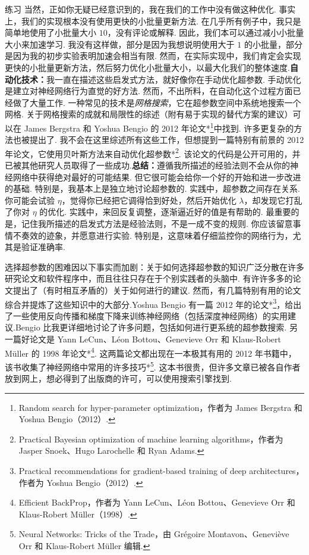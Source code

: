 \begin{exerciseBox}{练习}
当然，正如你无疑已经意识到的，我在我们的工作中没有做这种优化. 事实上，我们的实现根本没有使用更快的小批量更新方法. 在几乎所有例子中，我只是简单地使用了小批量大小 $10$，没有评论或解释. 因此，我们本可以通过减小小批量大小来加速学习. 我没有这样做，部分是因为我想说明使用大于 $1$ 的小批量，部分是因为我的初步实验表明加速会相当有限. 然而，在实际实现中，我们肯定会实现更快的小批量更新方法，然后努力优化小批量大小，以最大化我们的整体速度.\textbf{自动化技术：}我一直在描述这些启发式方法，就好像你在手动优化超参数. 手动优化是建立对神经网络行为直觉的好方法. 然而，不出所料，在自动化这个过程方面已经做了大量工作. 一种常见的技术是\emph{网格搜索}，它在超参数空间中系统地搜索一个网格. 关于网格搜索的成就和局限性的综述（附有易于实现的替代方案的建议）可以在 James Bergstra 和 Yoshua Bengio 的 2012 年论文*\footnote{Random search for hyper-parameter optimization，作者为 James Bergstra 和 Yoshua Bengio（2012）.}中找到. 许多更复杂的方法也被提出了. 我不会在这里综述所有这些工作，但想提到一篇特别有前景的 2012 年论文，它使用贝叶斯方法来自动优化超参数*\footnote{Practical Bayesian optimization of machine learning algorithms，作者为 Jasper Snoek、Hugo Larochelle 和 Ryan Adams.}. 该论文的代码是公开可用的，并已被其他研究人员取得了一些成功.\textbf{总结：}遵循我所描述的经验法则不会从你的神经网络中获得绝对最好的可能结果. 但它很可能会给你一个好的开始和进一步改进的基础. 特别是，我基本上是独立地讨论超参数的. 实践中，超参数之间存在关系. 你可能会试验 $\eta$，觉得你已经把它调得恰到好处，然后开始优化 $\lambda$，却发现它打乱了你对 $\eta$ 的优化. 实践中，来回反复调整，逐渐逼近好的值是有帮助的. 最重要的是，记住我所描述的启发式方法是经验法则，不是一成不变的规则. 你应该留意事情不奏效的迹象，并愿意进行实验. 特别是，这意味着仔细监控你的网络行为，尤其是验证准确率.

选择超参数的困难因以下事实而加剧：关于如何选择超参数的知识广泛分散在许多研究论文和软件程序中，而且往往只存在于个别实践者的头脑中. 有许许多多的论文提出了（有时相互矛盾的）关于如何进行的建议. 然而，有几篇特别有用的论文综合并提炼了这些知识中的大部分.Yoshua Bengio 有一篇 2012 年的论文*\footnote{Practical recommendations for gradient-based training of deep architectures，作者为 Yoshua Bengio（2012）.}，给出了一些使用反向传播和梯度下降来训练神经网络（包括深度神经网络）的实用建议.Bengio 比我更详细地讨论了许多问题，包括如何进行更系统的超参数搜索. 另一篇好论文是 Yann LeCun、Léon Bottou、Genevieve Orr 和 Klaus-Robert Müller 的 1998 年论文*\footnote{Efficient BackProp，作者为 Yann LeCun、Léon Bottou、Genevieve Orr 和 Klaus-Robert Müller（1998）.}. 这两篇论文都出现在一本极其有用的 2012 年书籍中，该书收集了神经网络中常用的许多技巧*\footnote{Neural Networks: Tricks of the Trade，由 Grégoire Montavon、Geneviève Orr 和 Klaus-Robert Müller 编辑.}. 这本书很贵，但许多文章已被各自作者放到网上，想必得到了出版商的许可，可以使用搜索引擎找到.


\end{exerciseBox}
